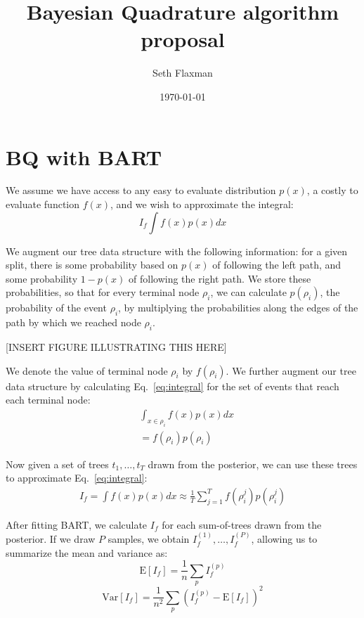 \documentclass[12pt]{article}
\title{Bayesian Quadrature algorithm proposal}
\date{\today}
\author{Seth Flaxman}
\begin{document}
\maketitle 

\section{BQ with BART}
We assume we have access to any easy to evaluate distribution $p(x)$, a costly to evaluate function $f(x)$,
and we wish to approximate the integral:
\begin{equation}
I_f \int f(x) p(x) dx
\label{eq:integral}
\end{equation}

We augment our tree data structure with the following information: 
for a given split, there is some probability
based on $p(x)$ of following the left path, and some probability $1-p(x)$ of following the right path. We store
these probabilities, so that for every terminal node $\rho_i$, we can calculate $p(\rho_i)$, the probability of the
event $\rho_i$, by multiplying the probabilities along the edges of the path by which we reached node $\rho_i$.

[INSERT FIGURE ILLUSTRATING THIS HERE]

We denote the value of terminal node $\rho_i$ by $f(\rho_i)$.
We further augment our tree data structure by calculating Eq.~\eqref{eq:integral} for the set of events that reach
each terminal node:
\begin{align}
& \int_{x \in \rho_i} f(x) p(x) dx \\
 &=  f(\rho_i) p(\rho_i)
\end{align}

Now given a set of trees $t_1, \ldots, t_T$ drawn from the posterior, we can use these trees to approximate
Eq.~\eqref{eq:integral}:
\begin{align}
I_f = \int f(x)p(x) dx \approx \frac{1}{T} \sum_{j=1}^T f(\rho_i^j) p(\rho_i^j)
\end{align}

After fitting BART, we calculate $I_f$ for each sum-of-trees drawn from the posterior.
If we draw $P$ samples, we obtain $I_f^{(1)}, \ldots, I_f^{(P)}$, allowing us to summarize
the mean and variance as:
\begin{equation}
	\mbox{E}[I_f] = \frac{1}{n} \sum_p I_f^{(p)}
\end{equation}
\begin{equation}
	\mbox{Var}[I_f] = \frac{1}{n^2} \sum_p (I_f^{(p)} - \mbox{E}[I_f])^2
\end{equation}
\end{document}
